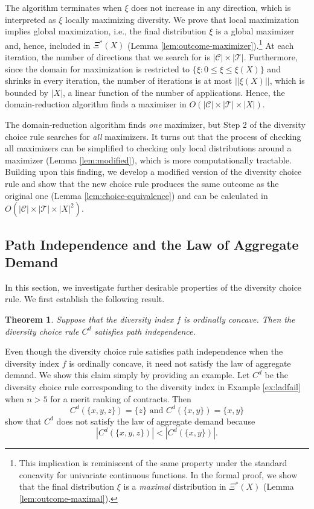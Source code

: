 \documentclass[12pt]{amsart}
\newtheorem{theorem}{Theorem}
\theoremstyle{remark}
\def\oconcave{ordinally concave} %
\newcommand{\norm}[1]{|| #1 ||}
\newcommand{\fk}[1]{{\color{red} FK: #1 }}
\begin{document}
The algorithm terminates when $\xi$ does not increase in any direction, which is interpreted as $\xi$ locally maximizing diversity.
We prove that  local maximization implies global maximization, i.e., the final distribution $\xi$ is
a global maximizer and, hence, included in $\Xi^*(X)$ (Lemma \ref{lem:outcome-maximizer}).\footnote{This implication is reminiscent of the same property under the standard concavity for univariate continuous functions. In the formal proof, we show that the final distribution $\xi$ is a {\it maximal} distribution in $\Xi^*(X)$ (Lemma \ref{lem:outcome-maximal}).}
At each iteration, the number of directions that we search for is $|\mathcal{C}| \times |\mathcal{T}|$.
Furthermore, since the domain for maximization is restricted to $\{\xi:0\leq \xi\leq \xi(X)\}$ and shrinks in every iteration, the number of iterations is at most $\norm{\xi(X)}$, which is bounded by $|X|$, a linear function of the number of applications. Hence, the domain-reduction algorithm finds a maximizer in $O(|\mathcal{C}| \times |\mathcal{T}| \times |X|)$.


The domain-reduction algorithm finds {\it one} maximizer, but Step 2 of the diversity choice rule searches for {\it all} maximizers.
It turns out that the process of checking all maximizers can be simplified to checking only local distributions around a maximizer
 (Lemma \ref{lem:modified}), which is more computationally tractable.
Building upon this finding, we develop a modified version of the diversity choice rule
and show that the new choice rule produces the same outcome as the original one (Lemma \ref{lem:choice-equivalence}) and can be
calculated in $O(|\mathcal{C}| \times |\mathcal{T}| \times |X|^2)$.

\medskip
\subsection{Path Independence and the Law of Aggregate Demand}
In this section, we investigate further desirable properties of the
diversity choice rule. We first establish the following result.

\begin{theorem}\label{thm:pi}
Suppose that the diversity index $f$ is \oconcave{}. Then the
diversity choice rule $C^d$ satisfies path independence.
\end{theorem}

Even though the diversity choice rule satisfies path independence
when the diversity index $f$ is ordinally concave, it need not satisfy
the law of aggregate demand. We show this claim simply by providing an
example. Let $C^d$ be the diversity choice rule corresponding to the
diversity index in Example \ref{ex:ladfail} when $n>5$ for a merit ranking
of contracts. Then
\[C^d(\{x,y,z\})=\{z\} \text{ and } C^d(\{x,y\})=\{x,y\}\]
show that $C^d$ does not satisfy the law of aggregate demand because
\[\left|C^d(\{x,y,z\})\right| < \left|C^d(\{x,y\})\right|.\]
\end{document}
